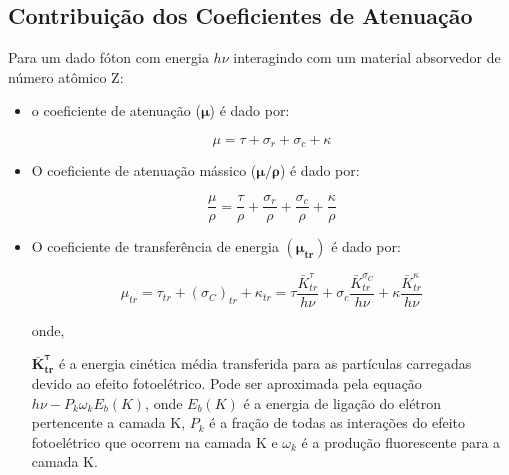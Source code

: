 \documentclass[11pt,a4paper]{article}
\begin{document}
        \subsection{Contribuição dos Coeficientes de Atenuação}

            Para um dado fóton com energia $h\nu$ interagindo com um material absorvedor de número atômico Z:
            
            \begin{itemize}
                \item o coeficiente de atenuação ($\mathbf{\mu}$) é dado por:

                    \begin{equation}
                        \mu = \tau + \sigma_r + \sigma_c + \kappa
                    \end{equation}

                \item O coeficiente de atenuação mássico ($\mathbf{\mu/\rho}$) é dado por:
                
                    \begin{equation}
                        \frac{\mu}{\rho} = \frac{\tau}{\rho} + \frac{\sigma_r}{\rho} + \frac{\sigma_c}{\rho} + \frac{\kappa}{\rho}
                    \end{equation}

                \item O coeficiente de transferência de energia $(\mathbf{\mu_{tr}})$ é dado por:
                
                    \begin{equation}
                        \mu_{tr} = \tau_{tr} + (\sigma_C)_{tr} + \kappa_{tr}
                        = \tau \frac{\bar{K}_{tr}^{\tau}}{h\nu} + \sigma_c \frac{\bar{K}_{tr}^{\sigma_C}}{h\nu} + \kappa \frac{\bar{K}_{tr}^{\kappa}}{h\nu}
                    \end{equation}

                \noindent onde,


                \noindent $\mathbf{\bar{K}_{tr}^{\tau}}$ é a energia cinética média transferida para as partículas carregadas devido ao efeito fotoelétrico. Pode ser aproximada pela equação $h\nu - P_k \omega_k E_b(K)$, onde $E_b(K)$ é a energia de ligação do elétron pertencente a camada K, $P_k$ é a fração de todas as interações do efeito fotoelétrico que ocorrem na camada K e $\omega_k$ é a produção fluorescente para a camada K.
                


\end{itemize}
\end{document}
